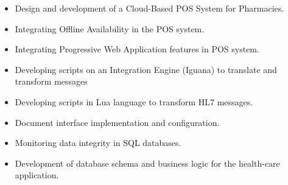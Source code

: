 \documentclass[10pt,a4paper,ragged2e]{altacv}
\begin{document}
\begin{itemize}
    \item Design and development of a Cloud-Based POS System for Pharmacies.
    \item Integrating Offline Availability in the POS system.
    \item Integrating Progressive Web Application features in POS system.
\end{itemize}

\vspace{10px}

\begin{itemize}
    \item Developing scripts on an Integration Engine (Iguana) to translate and transform messages
    \item Developing scripts in Lua language to transform HL7 messages.
    \item Document interface implementation and configuration.
    \item Monitoring data integrity in SQL databases.
    \item Development of database schema and business logic for the health-care application.
\end{itemize}


\vspace{10px}


\clearpage
\end{document}
